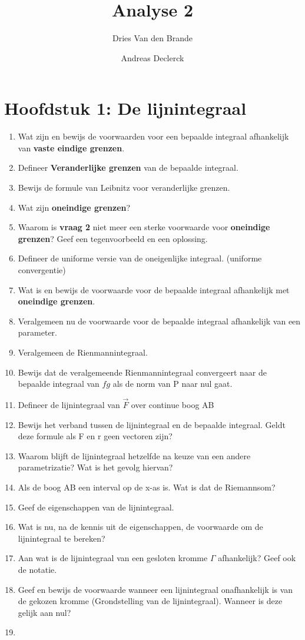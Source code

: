 \documentclass[12pt]{article}
\begin{document}
    \title{Analyse 2}
    \author{Dries Van den Brande \and Andreas Declerck}

    \maketitle
    \section*{Hoofdstuk 1: De lijnintegraal}
    \begin{enumerate}
        \item Wat zijn en bewijs de voorwaarden voor een bepaalde integraal afhankelijk van \textbf{vaste eindige grenzen}.
        \item Defineer \textbf{Veranderlijke grenzen} van de bepaalde integraal.
        \item Bewijs de formule van Leibnitz voor veranderlijke grenzen.
        \item Wat zijn \textbf{oneindige grenzen}?
        \item Waarom is \textbf{vraag 2} niet meer een sterke voorwaarde voor \textbf{oneindige grenzen}? Geef een tegenvoorbeeld en een oplossing.
        \item Defineer de uniforme versie van de oneigenlijke integraal. (uniforme convergentie)
        \item Wat is en bewijs de voorwaarde voor de bepaalde integraal afhankelijk met \textbf{oneindige grenzen}.
        \item Veralgemeen nu de voorwaarde voor de bepaalde integraal afhankelijk van een parameter.
        \item Veralgemeen de Rienmannintegraal.
        \item Bewijs dat de veralgemeende Rienmannintegraal convergeert naar de bepaalde integraal van $fg$ als de norm van P naar nul gaat.
        \item Defineer de lijnintegraal van $\vec{F}$ over continue boog AB
        \item Bewijs het verband tussen de lijnintegraal en de bepaalde integraal. Geldt deze formule als F en r geen vectoren zijn?
        \item Waarom blijft de lijnintegraal hetzelfde na keuze van een andere parametrizatie? Wat is het gevolg hiervan?
        \item Als de boog AB een interval op de x-as is. Wat is dat de Riemannsom?
        \item Geef de eigenschappen van de lijnintegraal.
        \item Wat is nu, na de kennis uit de eigenschappen, de voorwaarde om de lijnintegraal te bereken?
        \item Aan wat is de lijnintegraal van een gesloten kromme $\Gamma$ afhankelijk? Geef ook de notatie.
        \item Geef en bewijs de voorwaarde wanneer een lijnintegraal onafhankelijk is van de gekozen kromme (Grondstelling van de lijnintegraal). Wanneer is deze gelijk aan nul?
        \item 
    \end{enumerate}    
\end{document}
